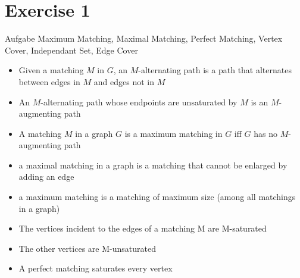 
\section{Exercise 1}

\setcounter{exercise}{1}

\begin{frame}[allowframebreaks]{Aufgabe \thesection}{\scriptsize Maximum Matching, Maximal Matching, Perfect Matching, Vertex Cover, Independant Set, Edge Cover}
  \begin{solution}
  \end{solution}
  \begin{requirementsnoinc}
    \begin{itemize}
      \item Given a matching $M$ in $G$, an \alert{$M$-alternating path} is a path that alternates between edges in $M$ and edges not in $M$
      \item An $M$-alternating path whose endpoints are unsaturated by $M$ is an \alert{$M$-augmenting path}
      \item  A matching $M$ in a graph $G$ is a \alert{maximum matching} in $G$ \alert{iff} $G$ has \alert{no $M$-augmenting path}
      \item a \alert{maximal matching} in a graph is a matching that cannot be enlarged by adding an edge
      \item a \alert{maximum matching} is a matching of maximum size (among all matchings in a graph)
      \item The vertices incident to the edges of a matching M are \alert{M-saturated}
      \item The other vertices are \alert{M-unsaturated}
      \item A \alert{perfect matching} saturates every vertex
    \end{itemize}
  \end{requirementsnoinc}
  \begin{solution}
  \end{solution}
  \begin{solution}
  \end{solution}
  \begin{solutionnoinc}
    \begin{columns}
      \begin{column}{0.5\textwidth}

\end{column}
\end{columns}
\end{solutionnoinc}
\end{frame}
